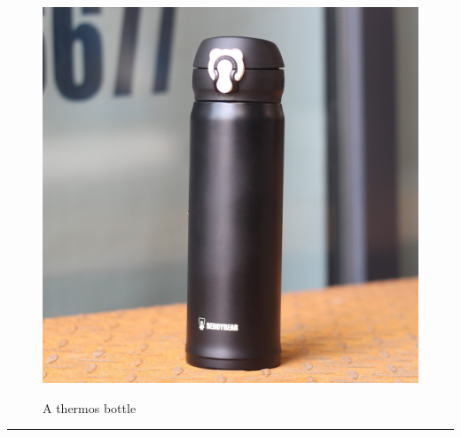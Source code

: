 \documentclass{article}
\begin{document}
    \begin{figure}[H]
        \centering
        \begin{minipage}{0.25\textwidth}
            \centering
            \includegraphics[width=\textwidth]{../SurvivalItemImages/thermos}
        \end{minipage}\hfill
        \begin{minipage}{0.7\textwidth}
            \centering
            \Large A thermos bottle
        \end{minipage}
    \end{figure}
    \vspace{-0.8em}
    \noindent\rule{\textwidth}{0.4pt}
            
    \clearpage
\end{document}
